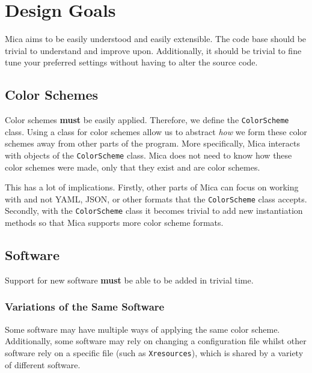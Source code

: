 \documentclass{article}
\theoremstyle{definition}
\begin{document}
    \section{Design Goals}

    Mica aims to be easily understood and easily extensible. The code base should be trivial to understand and improve upon. Additionally, it should be trivial to fine tune your preferred settings without having to alter the source code.


    \subsection{Color Schemes}

    Color schemes \textbf{must} be easily applied. Therefore, we define the \texttt{ColorScheme} class. Using a class for color schemes allow us to abstract \emph{how} we form these color schemes away from other parts of the program. More specifically, Mica interacts with objects of the \texttt{ColorScheme} class. Mica does not need to know how these color schemes were made, only that they exist and are color schemes.

    This has a lot of implications. Firstly, other parts of Mica can focus on working with  and not YAML, JSON, or other formats that the \texttt{ColorScheme} class accepts. Secondly, with the \texttt{ColorScheme} class it becomes trivial to add new instantiation methods so that Mica supports more color scheme formats.

    \subsection{Software}

    Support for new software \textbf{must} be able to be added in trivial time.

    \subsubsection{Variations of the Same Software}

    Some software may have multiple ways of applying the same color scheme. Additionally, some software may rely on changing a configuration file whilst other software rely on a specific file (such as \texttt{Xresources}), which is shared by a variety of different software.
\end{document}
